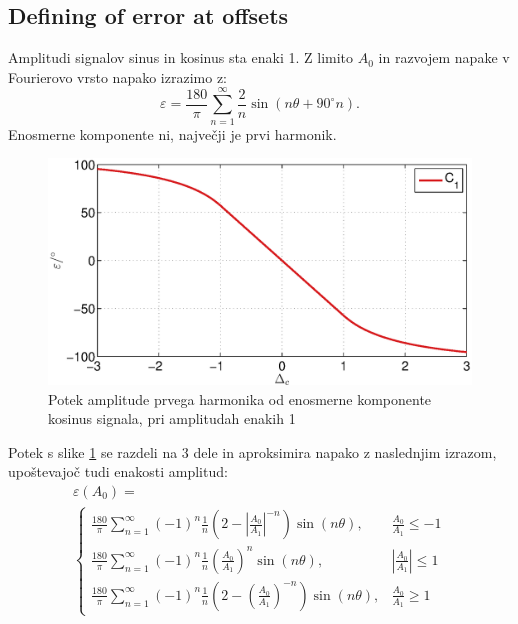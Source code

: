 \documentclass[a4paper]{article}
\begin{document}
\subsection{Defining of error at offsets}
Amplitudi signalov sinus in kosinus sta enaki 1.
Z limito $A_0$ in razvojem napake v Fourierovo vrsto napako izrazimo z:
\begin{equation}
\label{equ:off_lim_vrsta}
\varepsilon = \frac{180}{\pi}\sum_{n=1}^{\infty}\frac{2}{n} \sin (n \theta+ 90^\circ n).
\end{equation}
Enosmerne komponente ni,  največji je prvi harmonik.
\begin{figure}[!htb]
	\begin{center}
		\includegraphics[width=\linewidth]{./Slike/off.eps}
		\caption{Potek amplitude prvega harmonika od enosmerne komponente kosinus signala, pri amplitudah enakih 1} \label{fig:off}
	\end{center}
\end{figure}
Potek s slike \ref{fig:off} se razdeli na 3 dele in aproksimira napako z naslednjim izrazom, upoštevajoč tudi enakosti amplitud:
\begin{multline}
\label{equ:offc_err}
\varepsilon(A_0)=\\
\begin{cases}
\frac{180}{\pi}\sum_{n=1}^{\infty}(-1)^n\frac{1}{n}(2-|\frac{A_0}{A_1}|^{-n}) \sin (n \theta ), & \frac{A_0}{A_1}\leq -1 \\
\frac{180}{\pi}\sum_{n=1}^{\infty}(-1)^n\frac{1}{n}(\frac{A_0}{A_1})^n \sin (n \theta ), & |\frac{A_0}{A_1}|\leq 1 \\
\frac{180}{\pi}\sum_{n=1}^{\infty}(-1)^n\frac{1}{n}(2-(\frac{A_0}{A_1})^{-n}) \sin (n \theta ), & \frac{A_0}{A_1}\geq 1
\end{cases}
\end{multline}
\end{document}
